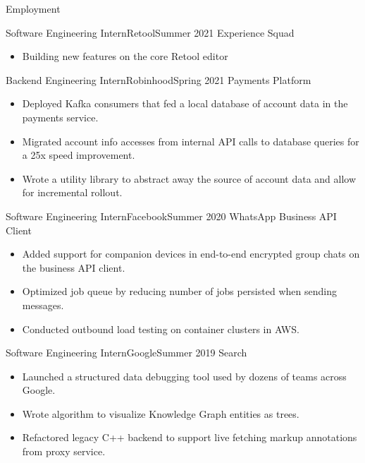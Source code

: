 \documentclass[calibri]{mcdowellcv}
\begin{document}
\makeheader

\begin{cvsection}{Employment}
	\begin{cvsubsection}{Software Engineering Intern}{Retool}{Summer 2021}
		Experience Squad
		\begin{itemize}
			\item Building new features on the core Retool editor
		\end{itemize}
	\end{cvsubsection}

	\begin{cvsubsection}{Backend Engineering Intern}{Robinhood}{Spring 2021}
		Payments Platform
		\begin{itemize}
			\item Deployed Kafka consumers that fed a local database of account data in the payments service.
			\item Migrated account info accesses from internal API calls to database queries for a 25x speed improvement.
			\item Wrote a utility library to abstract away the source of account data and allow for incremental rollout.
		\end{itemize}
	\end{cvsubsection}


	\begin{cvsubsection}{Software Engineering Intern}{Facebook}{Summer 2020}
		WhatsApp Business API Client
		\begin{itemize}
			\item Added support for companion devices in end-to-end encrypted group chats on the business API client.
			\item Optimized job queue by reducing number of jobs persisted when sending messages.
			\item Conducted outbound load testing on container clusters in AWS.
		\end{itemize}
	\end{cvsubsection}

	\begin{cvsubsection}{Software Engineering Intern}{Google}{Summer 2019}
		Search
		\begin{itemize}
			\item Launched a structured data debugging tool used by dozens of teams across Google.
			\item Wrote algorithm to visualize Knowledge Graph entities as trees.
			\item Refactored legacy C++ backend to support live fetching markup annotations from proxy service.
		\end{itemize}
	\end{cvsubsection}


\end{cvsection}
\end{document}
